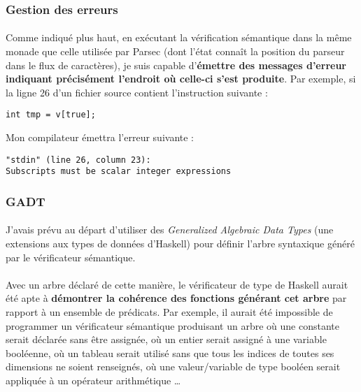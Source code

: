 \documentclass[a4paper]{article}
\begin{document}
   \subsubsection{Gestion des erreurs}

    \paragraph{}Comme indiqué plus haut, en exécutant la vérification sémantique
dans la même monade que celle utilisée par Parsec (dont l'état connaît la
position du parseur dans le flux de caractères), je suis capable
d'\textbf{émettre des messages d'erreur indiquant précisément l'endroit où
celle-ci s'est produite}. \newline
Par exemple, si la ligne 26 d'un fichier source contient l'instruction suivante :
    \begin{verbatim}
int tmp = v[true];
    \end{verbatim}
    Mon compilateur émettra l'erreur suivante :
    \begin{verbatim}
"stdin" (line 26, column 23):
Subscripts must be scalar integer expressions
    \end{verbatim}

   \subsubsection{GADT}

    \paragraph{}J'avais prévu au départ d'utiliser des \textit{Generalized
Algebraic Data Types} (une extensions aux types de données d'Haskell) pour
définir l'arbre syntaxique généré par le vérificateur sémantique.

    \paragraph{}Avec un arbre déclaré de cette manière, le vérificateur de type
de Haskell aurait été apte à \textbf{démontrer la cohérence des fonctions
générant cet arbre} par rapport à un ensemble de prédicats. \newline
Par exemple, il aurait été impossible de programmer un vérificateur sémantique
produisant un arbre où une constante serait déclarée sans être assignée,
où un entier serait assigné à une variable booléenne, où un tableau serait
utilisé sans que tous les indices de toutes ses dimensions ne soient renseignés,
où une valeur/variable de type booléen serait appliquée à un opérateur
arithmétique \dots
\end{document}
